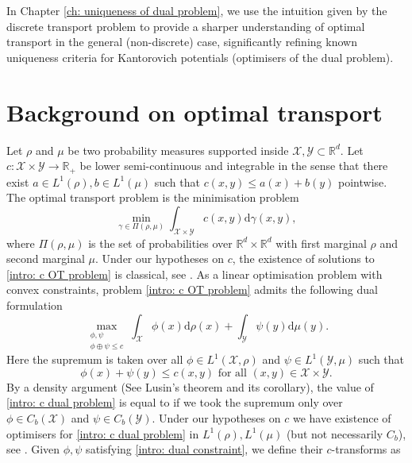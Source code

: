 \documentclass[11pt, oneside, titlepage]{book}
\theoremstyle{plain}
\theoremstyle{definition}
\newcommand{\R}{\mathbb{R}}
\newcommand{\X}{\mathcal{X}}
\newcommand{\Y}{\mathcal{Y}}
\newcommand{\di}{\mathrm{d}}
\begin{document}
In Chapter \ref{ch: uniqueness of dual problem}, we use the intuition given by the discrete transport problem to provide a sharper understanding of optimal transport in the general (non-discrete) case, significantly refining known uniqueness criteria for Kantorovich potentials (optimisers of the dual problem).


\section{Background on optimal transport}

Let $\rho$ and $\mu$ be two probability measures supported inside $\X, \Y \subset \R^d$. Let $c : \X \times \Y \to \R_+$  be lower semi-continuous and integrable in the sense that there exist $a \in L^1(\rho), b \in L^1(\mu)$ such that $c(x, y) \leq a(x) + b(y)$ pointwise. The optimal transport problem is the minimisation problem
\begin{equation}
\label{intro: c OT problem}
    \min_{\gamma \in \Pi(\rho, \mu)} \int_{\X \times \Y} c(x,y) \di \gamma(x, y),
\end{equation}
where $\Pi(\rho, \mu)$ is the set of probabilities over $\R^d \times \R^d$ with first marginal $\rho$ and second marginal $\mu$. Under our hypotheses on $c$, the existence of solutions to \eqref{intro: c OT problem} is classical, see \cite[Theorem 1.3]{villani2021topics}. As a linear optimisation problem with convex constraints, problem \eqref{intro: c OT problem} admits the following dual formulation
\begin{equation}
\label{intro: c dual problem}
    \max_{\substack{\phi, \psi \\ \phi \oplus \psi \leq c}} \int_\X \phi(x) \di \rho(x) + \int_\Y \psi(y) \di \mu(y).
\end{equation}
Here the supremum is taken over all $\phi \in L^1(\X, \rho)$ and $\psi \in L^1(\Y, \mu)$ such that 
\begin{equation}
    \label{intro: dual constraint}
    \phi(x) + \psi(y) \leq c(x, y) \text{  for all  } (x,y) \in \X \times \Y.
\end{equation}
By a density argument (See Lusin's theorem \cite[Theorem 2.24]{rudin1987real} and its corollary), the value of \eqref{intro: c dual problem} is equal to if we took the supremum only over $\phi \in C_b(\X)$ and $\psi \in C_b(\Y)$. Under our hypotheses on $c$ we have existence of optimisers for \eqref{intro: c dual problem} in $L^1(\rho), L^1(\mu)$ (but not necessarily $C_b$), see \cite[Theorem 5.10]{villani2008optimal}. Given $\phi, \psi$ satisfying \eqref{intro: dual constraint}, we define their $c$-transforms as 
\end{document}
